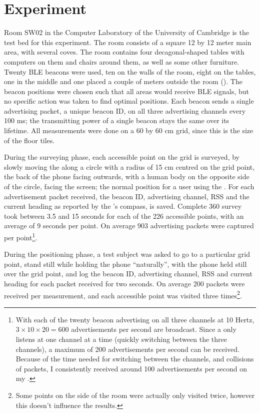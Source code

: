 \section{Experiment}
Room SW02 in the Computer Laboratory of the University of Cambridge is the test bed for this experiment.
The room consists of a square 12 by 12 meter main area, with several coves.
The room contains four decagonal-shaped tables with computers on them and chairs around them, as well as some other furniture.
Twenty BLE beacons were used, ten on the walls of the room, eight on the tables, one in the middle and one placed a couple of meters outside the room ().
The beacon positions were chosen such that all areas would receive BLE signals, but no specific action was taken to find optimal positions.
Each beacon sends a single advertising packet, a unique beacon ID, on all three advertising channels every 100 ms; the transmitting power of a single beacon stays the same over its lifetime.
All measurements were done on a 60 by 60 cm grid, since this is the size of the floor tiles.

During the surveying phase, each accessible point on the grid is surveyed, by slowly moving the \device along a circle with a radius of 15 cm centred on the grid point, the back of the phone facing outwards, with a human body on the opposite side of the circle, facing the screen; the normal position for a user using the \device.
For each advertisement packet received, the beacon ID, advertising channel, RSS and the current heading as reported by the \device's compass, is saved.
Complete 360\textdegree{} survey took between 3.5 and 15 seconds for each of the 226 accessible points, with an average of 9 seconds per point.
On average 903 advertising packets were captured per point\footnote{With each of the twenty beacon advertising on all three channels at 10 Hertz, $3 \times 10 \times 20 = 600$ advertisements per second are broadcast. Since a \device only listens at one channel at a time (quickly switching between the three channels), a maximum of 200 advertisements per second can be received. Because of the time needed for switching between the channels, and collisions of packets, I consistently received around 100 advertisements per second on my \device.}.

During the positioning phase, a test subject was asked to go to a particular grid point, stand still while holding the phone ``naturally'', with the phone held still over the grid point, and log the beacon ID, advertising channel, RSS and current heading for each packet received for two seconds.
On average 200 packets were received per measurement, and each accessible point was visited three times\footnote{Some points on the side of the room were actually only visited twice, however this doesn't influence the results.}.

